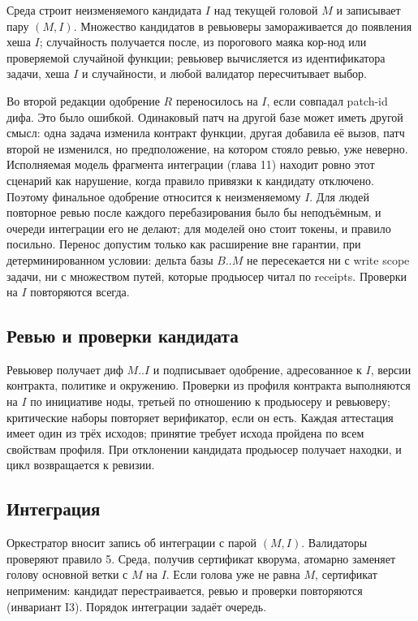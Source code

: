 Среда строит неизменяемого кандидата $I$ над текущей головой $M$ и записывает пару $(M, I)$. Множество кандидатов в ревьюверы замораживается до появления хеша $I$; случайность получается после, из порогового маяка кор-нод или проверяемой случайной функции; ревьювер вычисляется из идентификатора задачи, хеша $I$ и случайности, и любой валидатор пересчитывает выбор.

\begin{whybox}
Во второй редакции одобрение $R$ переносилось на $I$, если совпадал patch-id дифа. Это было ошибкой. Одинаковый патч на другой базе может иметь другой смысл: одна задача изменила контракт функции, другая добавила её вызов, патч второй не изменился, но предположение, на котором стояло ревью, уже неверно. Исполняемая модель фрагмента интеграции (глава 11) находит ровно этот сценарий как нарушение, когда правило привязки к кандидату отключено. Поэтому финальное одобрение относится к неизменяемому $I$. Для людей повторное ревью после каждого перебазирования было бы неподъёмным, и очереди интеграции его не делают; для моделей оно стоит токены, и правило посильно. Перенос допустим только как расширение вне гарантии, при детерминированном условии: дельта базы $B..M$ не пересекается ни с write scope задачи, ни с множеством путей, которые продьюсер читал по receipts. Проверки на $I$ повторяются всегда.
\end{whybox}

\subsection{Ревью и проверки кандидата}

Ревьювер получает диф $M..I$ и подписывает одобрение, адресованное к $I$, версии контракта, политике и окружению. Проверки из профиля контракта выполняются на $I$ по инициативе ноды, третьей по отношению к продьюсеру и ревьюверу; критические наборы повторяет верификатор, если он есть. Каждая аттестация имеет один из трёх исходов; принятие требует исхода пройдена по всем свойствам профиля. При отклонении кандидата продьюсер получает находки, и цикл возвращается к ревизии.

\subsection{Интеграция}

Оркестратор вносит запись об интеграции с парой $(M, I)$. Валидаторы проверяют правило 5. Среда, получив сертификат кворума, атомарно заменяет голову основной ветки с $M$ на $I$. Если голова уже не равна $M$, сертификат неприменим: кандидат перестраивается, ревью и проверки повторяются (инвариант I3). Порядок интеграции задаёт очередь.

